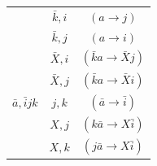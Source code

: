 \documentclass[./thesis.tex]{subfiles}
\begin{document}
\begin{table}
\begin{tabular}{ c|c|c }
		                                                                                                   & $\bar k,i$                                                                                   & $(a\rightarrow j)$                                              \\
		                                                                                                   & $\bar k,j$                                                                                   & $(a\rightarrow i)$                                              \\
		                                                                                                   & $\bar X,i$                                                                                   & $(\bar ka  \rightarrow \bar X j)$                               \\
		                                                                                                   & $\bar X,j$                                                                                   & $(\bar ka  \rightarrow \bar X i)$                               \\
		\hline
		\rule{0pt}{3ex} $\bar a,\bar i j k$                                                                                & $j,k$                                                                                        & $(\bar a\rightarrow \bar i)$                                    \\
		                                                                                                   & $X,j$                                                                                        & $(k\bar a\rightarrow X\bar i)$                                  \\
		                                                                                                   & $X,k$                                                                                        & $(j\bar a\rightarrow X\bar i)$                                  \\
		                 

\end{tabular}
\end{table}
\end{document}
